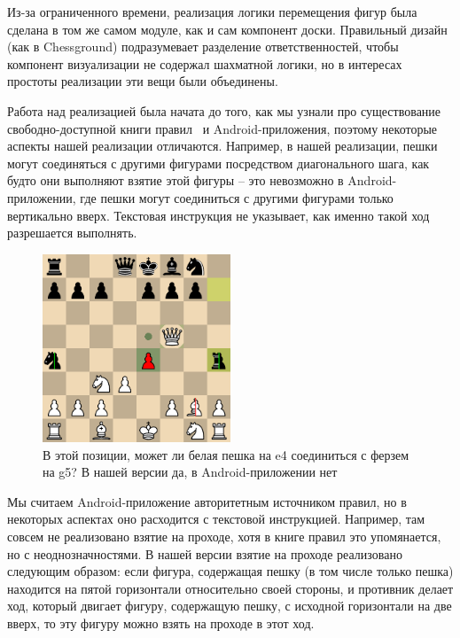 \documentclass{article}
\begin{document}
Из-за ограниченного времени, реализация логики перемещения фигур была сделана 
в том же самом модуле, как и сам компонент доски.
Правильный дизайн (как в Chessground) подразумевает разделение ответственностей,
чтобы компонент визуализации не содержал шахматной логики,
но в интересах простоты реализации эти вещи были объединены. 

Работа над реализацией была начата до того, как мы узнали про
существование свободно-доступной книги правил~\cite{chessplus-rules} и Android-приложения,
поэтому некоторые аспекты нашей реализации отличаются.
Например, в нашей реализации, пешки могут соединяться с другими фигурами посредством диагонального шага,
как будто они выполняют взятие этой фигуры --
это невозможно в Android-приложении, где пешки могут соединиться с другими фигурами
только вертикально вверх.
Текстовая инструкция не указывает, как именно такой ход разрешается выполнять.

\begin{figure}[h]
    \centering
    \includegraphics[width=0.5\textwidth]{img/diagonal-merging-question.png}
    \caption{В этой позиции, может ли белая пешка на e4 соединиться с ферзем на g5? В нашей версии да, в Android-приложении нет}
\end{figure}

Мы считаем Android-приложение авторитетным источником правил,
но в некоторых аспектах оно расходится с текстовой инструкцией.
Например, там совсем не реализовано взятие на проходе,
хотя в книге правил это упомянается, но с неоднозначностями.
В нашей версии взятие на проходе реализовано следующим образом:
если фигура, содержащая пешку (в том числе только пешка)
находится на пятой горизонтали относительно своей стороны,
и противник делает ход, который двигает фигуру, содержащую пешку,
с исходной горизонтали на две вверх,
то эту фигуру можно взять на проходе в этот ход.
\end{document}
